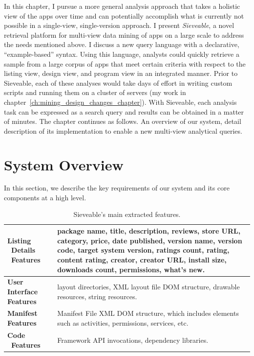 In this chapter, I pursue a more general analysis approach that takes a holistic view of the apps over time and can potentially accomplish what is currently not possible in a single-view, single-version approach.
I present \emph{Sieveable}, a novel retrieval platform for multi-view data mining of apps on a large scale to address the needs mentioned above.
I discuss a new query language with a declarative, ``example-based'' syntax.
Using this language, analysts could quickly retrieve a sample from a large corpus of apps that meet certain criteria with respect to the listing view, design view, and program view in an integrated manner.
Prior to Sieveable, each of these analyses would take days of effort in writing custom scripts and running them on a cluster of servers (my work in chapter~\ref{ch:mining_design_changes_chapter}).
With Sieveable, each analysis task can be expressed as a search query and results can be obtained in a matter of minutes.
The chapter continues as follows. An overview of our system, detail description of its implementation to enable a new multi-view analytical queries.


\section{System Overview}
In this section, we describe the key requirements of our system and its core components at a high level.

\begin{table}[t]
	\def\arraystretch{2}
	\centering
	\begin{tabular}{|>{\raggedright}p{2cm}|p{12.5cm}|}
		\hline
		\textbf{Listing \ Details \ Features} &
		package name, title, description, reviews, store URL, category, price, date published, version name, version code, target system version, ratings count, rating, content rating, creator, creator URL, install size, downloads count, permissions, what's new.\\
		\hline
		\textbf{User Interface Features} &
		layout directories, XML layout file DOM structure, drawable resources, string resources.\\
		\hline
		\textbf{Manifest Features}&
		Manifest File XML DOM structure, which includes elements such as activities, permissions, services, etc.\\
		\hline
		\textbf{Code \ Features} & 
		Framework API invocations, dependency libraries.\\
		\hline
	\end{tabular}
	\caption{Sieveable's main extracted features.}
	\label{tab:table_features}
\end{table}

